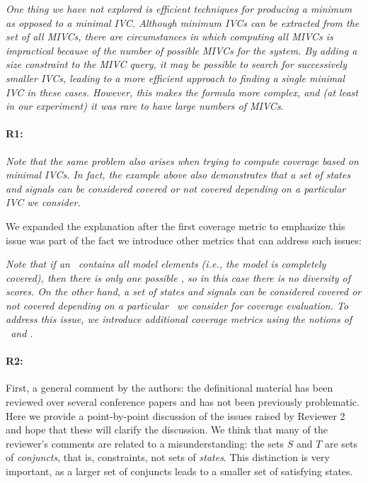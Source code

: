 \documentclass{article}
\begin{document}
\textit{
One thing we have not explored is efficient techniques for producing a {\em minimum} as opposed to a {\em minimal} IVC.  Although minimum IVCs can be extracted from the set of all MIVCs, there are circumstances in which computing all MIVCs is impractical because of the number of possible MIVCs for the system.  By adding a size constraint to the MIVC query, it may be possible to search for successively smaller IVCs, leading to a more efficient approach to finding a single minimal IVC in these cases.  However, this makes the formula more complex, and (at least in our experiment) it was rare to have large numbers of MIVCs.}

\paragraph{R1:} \textit{Note that the same problem also arises when trying to compute coverage based on minimal IVCs. In fact, the example above also demonstrates that a set of states and signals can be considered covered or not covered depending on a particular IVC we consider.}

\vspace{0.05in}
We expanded the explanation after the first coverage metric to emphasize this issue was part of the fact we introduce other metrics that can address such issues:

\textit{Note that if an \mivc ~contains all model elements (i.e., the model is {\em completely covered}), then there is only one possible \mivc , so in this case there is no diversity of scores. On the other hand, a set of states and signals can be considered covered or not covered depending on a particular \mivc\ we consider for coverage evaluation. To address this issue, we introduce additional coverage metrics using the notions of \may\ and \must.}

\paragraph{R2:} First, a general comment by the authors: the definitional material has been reviewed over several conference papers and has not been previously problematic. Here we provide a point-by-point discussion of the issues raised by Reviewer 2 and hope that these will clarify the discussion.  We think that many of the reviewer's comments are related to a misunderstanding: the sets $S$ and $T$ are sets of {\em conjuncts}, that is, constraints, not sets of {\em states}.  This distinction is very important, as a larger set of conjuncts leads to a smaller set of satisfying states.
\end{document}
